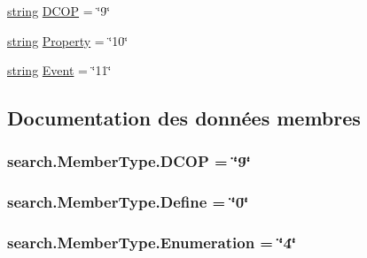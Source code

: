 \begin{DoxyCompactItemize}
\item 
\hyperlink{tclscanner_8cpp_a3b18665bed369c4cf583afc1b05f583a}{string} \hyperlink{classsearch_1_1_member_type_a02872e8b0d84287c43be90e87187341e}{D\+C\+O\+P} = \char`\"{}9\char`\"{}
\item 
\hyperlink{tclscanner_8cpp_a3b18665bed369c4cf583afc1b05f583a}{string} \hyperlink{classsearch_1_1_member_type_a184e02743c46e8af7da32e01925bab9b}{Property} = \char`\"{}10\char`\"{}
\item 
\hyperlink{tclscanner_8cpp_a3b18665bed369c4cf583afc1b05f583a}{string} \hyperlink{classsearch_1_1_member_type_adf979689f6ec7bad470c351cca3985bd}{Event} = \char`\"{}11\char`\"{}
\end{DoxyCompactItemize}


\subsection{Documentation des données membres}
\hypertarget{classsearch_1_1_member_type_a02872e8b0d84287c43be90e87187341e}{}
\subsubsection[{D\+C\+O\+P}]{ search.\+Member\+Type.\+D\+C\+O\+P = \char`\"{}9\char`\"{}\hspace{0.3cm}{\ttfamily [static]}}\label{classsearch_1_1_member_type_a02872e8b0d84287c43be90e87187341e}
\hypertarget{classsearch_1_1_member_type_aa908a50d2f305c3e16c6a4213fe9dfc2}{}
\subsubsection[{Define}]{ search.\+Member\+Type.\+Define = \char`\"{}0\char`\"{}\hspace{0.3cm}{\ttfamily [static]}}\label{classsearch_1_1_member_type_aa908a50d2f305c3e16c6a4213fe9dfc2}
\hypertarget{classsearch_1_1_member_type_ac21b740670962db652154a4e4852db7a}{}
\subsubsection[{Enumeration}]{ search.\+Member\+Type.\+Enumeration = \char`\"{}4\char`\"{}\hspace{0.3cm}{\ttfamily [static]}}\label{classsearch_1_1_member_type_ac21b740670962db652154a4e4852db7a}
\hypertarget{classsearch_1_1_member_type_a3c01f493d3472fbe18f9271dbb0260cf}{}

